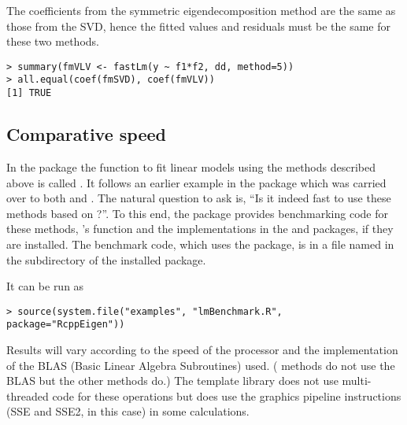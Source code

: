 \documentclass[shortnames,article]{jss}
\begin{document}
The coefficients from the symmetric eigendecomposition method are the
same as those from the SVD, hence the fitted values and residuals must
be the same for these two methods.

\begin{verbatim}
> summary(fmVLV <- fastLm(y ~ f1*f2, dd, method=5))
> all.equal(coef(fmSVD), coef(fmVLV))
[1] TRUE
\end{verbatim}

\subsection{Comparative speed}

In the  package the  function to fit linear
models using the methods described above is called . It follows
an earlier example in the  package which was carried over to both
 and . The natural question to ask is, ``Is it indeed fast to use these methods
based on ?''.  To this end, the package provides benchmarking code for these
methods, 's  function and the 
implementations in the  \citep{CRAN:RcppArmadillo}
and  \citep{CRAN:RcppGSL} packages, if they are
installed.  The benchmark code, which uses the 
\citep{CRAN:rbenchmark} package, is in a file named
 in the  subdirectory of the
installed  package.


It can be run as
\begin{verbatim}
> source(system.file("examples", "lmBenchmark.R", package="RcppEigen"))
\end{verbatim}
Results will vary according to the speed of the processor and the
implementation of the BLAS (Basic Linear Algebra Subroutines) used.
( methods do not use the BLAS but the other methods do.)
The  template library does not use multi-threaded code for
these operations but does use the graphics pipeline instructions (SSE
and SSE2, in this case) in some calculations. 
\end{document}

